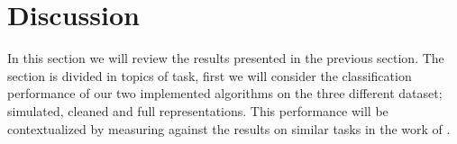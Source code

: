 \section{Discussion}
In this section we will review the results presented in the previous section. The section is divided in topics of task, first we will consider the classification performance of our two implemented algorithms on the three different dataset; simulated, cleaned and full representations. This performance will be contextualized by measuring against the results on similar tasks in the work of \citet{Kuchera2019}. 